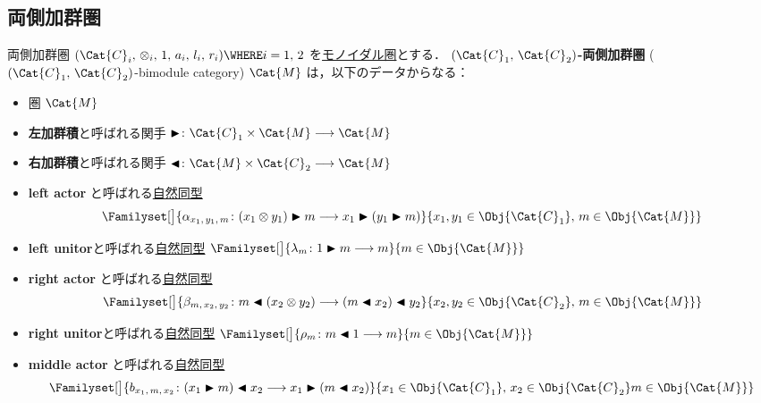 \documentclass[TQFT_main]{subfiles}
\begin{document}
\subsection{両側加群圏}

\begin{mydef}[label=def:bimodulecat,breakable]{両側加群圏}
    $(\Cat{C}_i,\, \otimes_i,\, 1,\, a_i,\, l_i,\, r_i) \WHERE i =1,\, 2$ を\hyperref[redef:monoidal-category]{モノイダル圏}とする．
    \textbf{$(\Cat{C}_1,\, \Cat{C}_2)$-両側加群圏} ($(\Cat{C}_1,\, \Cat{C}_2)$-bimodule category) $\Cat{M}$ は，以下のデータからなる：
    \begin{itemize}
        \item 圏 $\Cat{M}$
        \item \textbf{左加群積}と呼ばれる関手 $\btr \colon \Cat{C}_1 \times \Cat{M} \lto \Cat{M}$
        \item \textbf{右加群積}と呼ばれる関手 $\btl \colon \Cat{M} \times \Cat{C}_2 \lto \Cat{M}$
        \item \textbf{left actor} と呼ばれる\hyperref[def:nat]{自然同型}
        \begin{align}
            \Familyset[\big]{\alpha_{x_1,\, y_1,\, m} \colon (x_1 \otimes y_1) \btr m \lto x_1 \btr (y_1 \btr m)}{x_1,y_1\in \Obj{\Cat{C}_1},\, m \in \Obj{\Cat{M}}}
        \end{align}
        \item \textbf{left unitor}と呼ばれる\hyperref[def:nat]{自然同型} $\Familyset[\big]{\lambda_{m} \colon 1 \btr m \lto m}{m \in \Obj{\Cat{M}}}$
        \item \textbf{right actor} と呼ばれる\hyperref[def:nat]{自然同型}
        \begin{align}
            \Familyset[\big]{\beta_{m,\, x_2,\, y_2} \colon m \btl (x_2 \otimes y_2) \lto  (m \btl x_2) \btl y_2}{x_2,y_2 \in \Obj{\Cat{C}_2},\, m \in \Obj{\Cat{M}}}
        \end{align}
        \item \textbf{right unitor}と呼ばれる\hyperref[def:nat]{自然同型} $\Familyset[\big]{\rho_{m} \colon m \btl 1 \lto m}{m \in \Obj{\Cat{M}}}$
        \item \textbf{middle actor} と呼ばれる\hyperref[def:nat]{自然同型}
        \begin{align}
            \Familyset[\big]{b_{x_1,\,m,\, x_2} \colon (x_1 \btr m) \btl x_2 \lto  x_1 \btr (m \btl x_2)}{x_1 \in \Obj{\Cat{C}_1},\, x_2 \in \Obj{\Cat{C}_2} m \in \Obj{\Cat{M}}}
        \end{align}
    \end{itemize}

\end{mydef}
\end{document}
